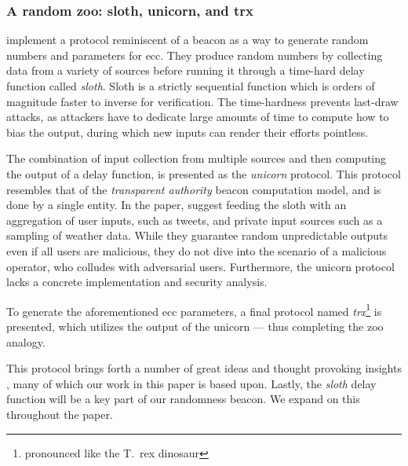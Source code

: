 \subsubsection{A random zoo: sloth, unicorn, and trx}%
\label{sub:random_zoo}
\citet{randomzoo} implement a protocol reminiscent of a beacon as a way to generate random numbers and parameters for \gls{ecc}.
They produce random numbers by collecting data from a variety of sources before running it through a time-hard delay function called \textit{sloth}.
Sloth is a strictly sequential function which is orders of magnitude faster to inverse for verification.
The time-hardness prevents last-draw attacks, as attackers have to dedicate large amounts of time to compute how to bias the output, during which new inputs can render their efforts pointless.

The combination of input collection from multiple sources and then computing the output of a delay function, is presented as the \textit{unicorn} protocol.
This protocol resembles that of the \emph{transparent authority} beacon computation model, and is done by a single entity.
In the paper, \citeauthor{randomzoo} suggest feeding the sloth with an aggregation of user inputs, such as tweets, and private input sources such as a sampling of weather data.
While they guarantee random unpredictable outputs even if all users are malicious, they do not dive into the scenario of a malicious operator, who colludes with adversarial users.
Furthermore, the unicorn protocol lacks a concrete implementation and security analysis.

To generate the aforementioned \gls{ecc} parameters, a final protocol named \textit{trx}\footnote{pronounced like the T.\ rex dinosaur} is presented, which utilizes the output of the unicorn --- thus completing the zoo analogy.

This protocol brings forth a number of great ideas  and thought provoking insights , many of which our work in this paper is based upon.
Lastly, the \emph{sloth} delay function will be a key part of our randomness beacon.
We expand on this throughout the paper. 
